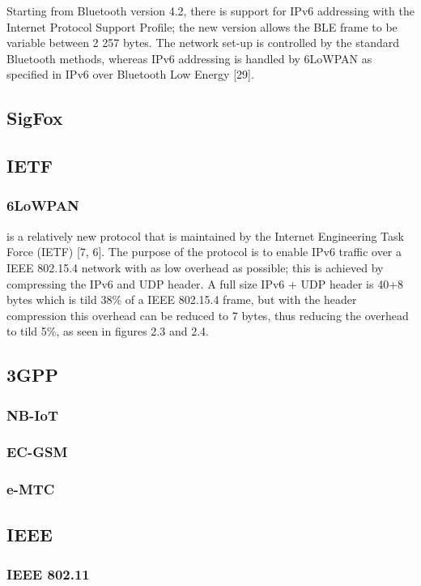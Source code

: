 Starting from Bluetooth version 4.2,
	there is support for IPv6 addressing with the Internet Protocol Support Profile;
	the new version allows the BLE frame to be variable between 2 257 bytes.
The network set-up is controlled by the standard Bluetooth methods,
	whereas IPv6 addressing is handled by 6LoWPAN as specified in IPv6 over Bluetooth Low Energy [29].


\subsection{SigFox}

\subsection{IETF}
\subsubsection{6LoWPAN} 
is a relatively new protocol that is maintained by the Internet
Engineering Task Force (IETF) [7, 6].
The purpose of the protocol is to enable IPv6 traffic over a IEEE 802.15.4 network with as low overhead as possible;
	this is achieved by compressing the IPv6 and UDP header.
A full size IPv6 + UDP header is 40+8 bytes which is tild 38\% of a IEEE 802.15.4
frame,
	but with the header compression this overhead can be reduced to 7 bytes,
	thus reducing the overhead to tild 5\%,
	as seen in figures 2.3 and 2.4.


\subsection{3GPP}
\subsubsection{NB-IoT}
\subsubsection{EC-GSM}
\subsubsection{e-MTC}


\subsection{IEEE}
\subsubsection{IEEE 802.11}



